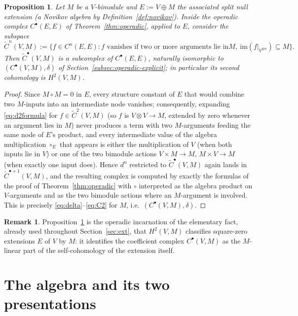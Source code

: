 \documentclass[11pt,reqno]{amsart}
\theoremstyle{plain}
\newtheorem{proposition}[theorem]{Proposition}
\theoremstyle{definition}
\newtheorem{remark}[theorem]{Remark}
\newcommand{\Ht}{H^2}
\begin{document}
\begin{proposition}\label{prop:operad-coeff}
Let $M$ be a $V$-bimodule and $E:=V\oplus M$ the associated split null extension
\textup{(}a Novikov algebra by Definition~\ref{def:novikov}\textup{)}. Inside the operadic
complex $C^\bullet(E,E)$ of Theorem~\ref{thm:operadic}, applied to $E$, consider the subspace
\[
\widetilde C^n(V,M):=\bigl\{f\in C^n(E,E):f\text{ vanishes if two or more arguments lie in
}M,\ \mathrm{im}(f|_{V^{\otimes n}})\subseteq M\bigr\} .
\]
Then $\widetilde C^\bullet(V,M)$ is a subcomplex of $C^\bullet(E,E)$, naturally isomorphic to
$(C^\bullet(V,M),\delta)$ of Section~\ref{subsec:operadic-explicit}; in particular its second
cohomology is $\Ht(V,M)$.
\end{proposition}

\begin{proof}
Since $M\circ M=0$ in $E$, every structure constant of $E$ that would combine two
$M$-inputs into an intermediate node vanishes; consequently, expanding
\eqref{eq:d2formula} for $f\in\widetilde C^2(V,M)$ (so $f$ is $V\otimes V\to M$, extended by
zero whenever an argument lies in $M$) never produces a term with two $M$-arguments feeding
the same node of $E$'s product, and every intermediate value of the algebra multiplication
$\circ_E$ that appears is either the multiplication of $V$ (when both inputs lie in $V$) or
one of the two bimodule actions $V\times M\to M$, $M\times V\to M$ (when exactly one input
does). Hence $d^n$ restricted to $\widetilde C^\bullet(V,M)$ again lands in
$\widetilde C^{\bullet+1}(V,M)$, and the resulting complex is computed by exactly the
formulas of the proof of Theorem~\ref{thm:operadic} with $\circ$ interpreted as the algebra
product on $V$-arguments and as the two bimodule actions where an $M$-argument is involved.
This is precisely \eqref{eq:delta}--\eqref{eq:C2} for $M$, i.e.\ $(C^\bullet(V,M),\delta)$.
\end{proof}

\begin{remark}
Proposition~\ref{prop:operad-coeff} is the operadic incarnation of the elementary fact,
already used throughout Section~\ref{sec:ext}, that $H^2(V,M)$ classifies square-zero
extensions $E$ of $V$ by $M$: it identifies the coefficient complex $C^\bullet(V,M)$ as the
$M$-linear part of the self-cohomology of the extension itself.
\end{remark}

\section{The algebra and its two presentations}\label{sec:alg}
\end{document}
